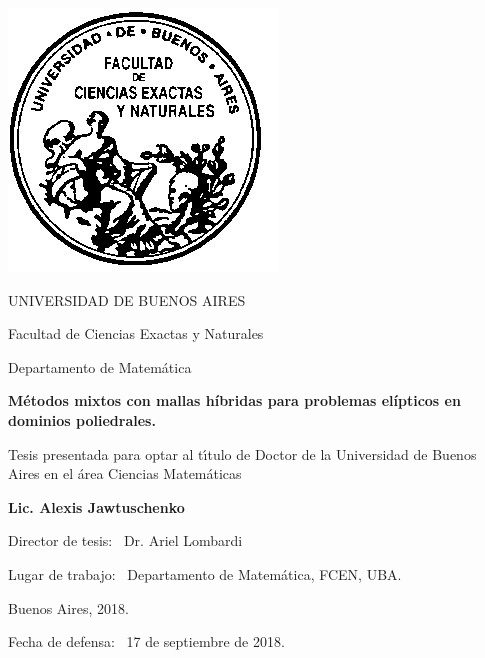 \documentclass[12pt,a4paper,openany,oneside]{book}
\begin{document}
\thispagestyle{empty}

\begin{center}

\includegraphics[scale=.3]{logofac.jpg}

\medskip
UNIVERSIDAD DE BUENOS AIRES

Facultad de Ciencias Exactas y Naturales

Departamento de Matem\'atica

\vspace{3cm}

\textbf{\large M\'etodos mixtos con mallas h\'ibridas para problemas el\'ipticos
en dominios poliedrales.}

\vspace{2cm}

Tesis presentada para optar al t\'\i tulo de Doctor de la Universidad de 
Buenos Aires en el \'area Ciencias Matem\'aticas

\vspace{2cm}

\textbf{Lic. Alexis Jawtuschenko}

\end{center}

\vspace{1.5cm}

\noindent Director de tesis: \ Dr. Ariel Lombardi%

\noindent Lugar de trabajo: \ Departamento de Matem\'atica, FCEN, UBA.

\vspace{1cm}

\noindent Buenos Aires, 2018.

\vspace{1cm}

\noindent Fecha de defensa: \ 17 de septiembre de 2018.
\newpage

\newpage


\tableofcontents{}












\end{document}
